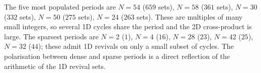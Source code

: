 \par
The five most populated periods are $N=54$ ($659$ sets), $N=58$ ($361$ sets), $N=30$ ($332$ sets), $N=50$ ($275$ sets), $N=24$ ($263$ sets). These are
multiples of many small integers, so several 1D cycles share the
period and the 2D cross-product is large. The sparsest periods are
$N=2$ ($1$), $N=4$ ($16$), $N=28$ ($23$), $N=42$ ($25$), $N=32$ ($44$); these admit 1D revivals on only a small subset of
cycles. The polarisation between dense and sparse periods is a
direct reflection of the arithmetic of the 1D revival sets.

